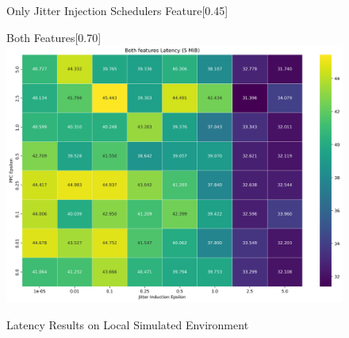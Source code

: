\begin{figure}[htbp]
\begin{subcaptionbox}{Only Jitter Injection Schedulers Feature\label{fig:local_jitter_latency}}[0.45\textwidth]
    \end{subcaptionbox}
    \vfill
    \begin{subcaptionbox}{Both Features\label{fig:local_both_latency}}[0.70\textwidth]
        {\includegraphics[width=\linewidth]{Chapters/Figures/Plots/local_latency_50_heatmap_5mib.png}}
    \end{subcaptionbox}
    \caption{Latency Results on Local Simulated Environment}\label{fig:local_latency}
\end{figure}

